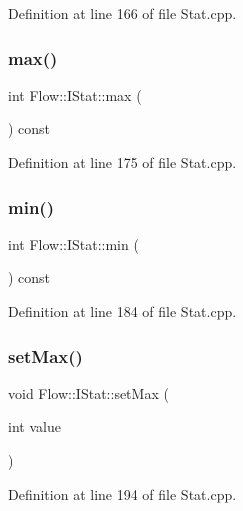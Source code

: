 Definition at line 166 of file Stat.\+cpp.

\hypertarget{class_flow_1_1_i_stat_abe1547a7dd83b47c0f60ad7aedaa1116}{}\label{class_flow_1_1_i_stat_abe1547a7dd83b47c0f60ad7aedaa1116} 
\subsubsection{\texorpdfstring{max()}{max()}}
{\footnotesize\ttfamily int Flow\+::\+I\+Stat\+::max (\begin{DoxyParamCaption}{ }\end{DoxyParamCaption}) const}



Definition at line 175 of file Stat.\+cpp.

\hypertarget{class_flow_1_1_i_stat_aae6da9e74e17f356697e518ba3974f70}{}\label{class_flow_1_1_i_stat_aae6da9e74e17f356697e518ba3974f70} 
\subsubsection{\texorpdfstring{min()}{min()}}
{\footnotesize\ttfamily int Flow\+::\+I\+Stat\+::min (\begin{DoxyParamCaption}{ }\end{DoxyParamCaption}) const}



Definition at line 184 of file Stat.\+cpp.

\hypertarget{class_flow_1_1_i_stat_aca87e5a3e7de304739f9a32d5176b0ee}{}\label{class_flow_1_1_i_stat_aca87e5a3e7de304739f9a32d5176b0ee} 
\subsubsection{\texorpdfstring{set\+Max()}{setMax()}}
{\footnotesize\ttfamily void Flow\+::\+I\+Stat\+::set\+Max (\begin{DoxyParamCaption}\item[{int}]{value }\end{DoxyParamCaption})}



Definition at line 194 of file Stat.\+cpp.

